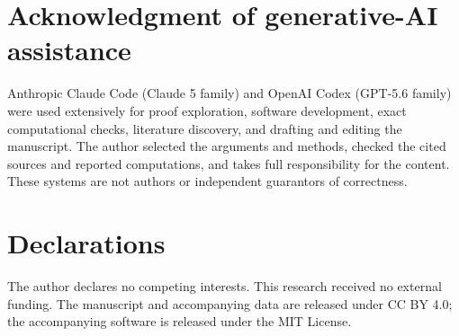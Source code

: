 \documentclass[11pt,a4paper]{amsart}
\theoremstyle{plain}
\theoremstyle{definition}
\theoremstyle{remark}
\begin{document}
\section*{Acknowledgment of generative-AI assistance}
Anthropic Claude Code (Claude 5 family) and OpenAI Codex (GPT-5.6 family) were
used extensively for proof exploration, software development, exact
computational checks, literature discovery, and drafting and editing the
manuscript. The author selected the arguments and methods, checked the cited
sources and reported computations, and takes full responsibility for the
content. These systems are not authors or independent guarantors of
correctness.

\section*{Declarations}
The author declares no competing interests. This research received no external
funding. The manuscript and accompanying data are released under CC BY 4.0;
the accompanying software is released under the MIT License.
\end{document}
